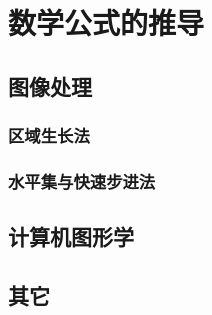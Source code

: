 \chapter{数学公式的推导}
\label{chap1a}

\section{图像处理}

\subsection{区域生长法}

\subsection{水平集与快速步进法}

\section{计算机图形学}

\section{其它}
